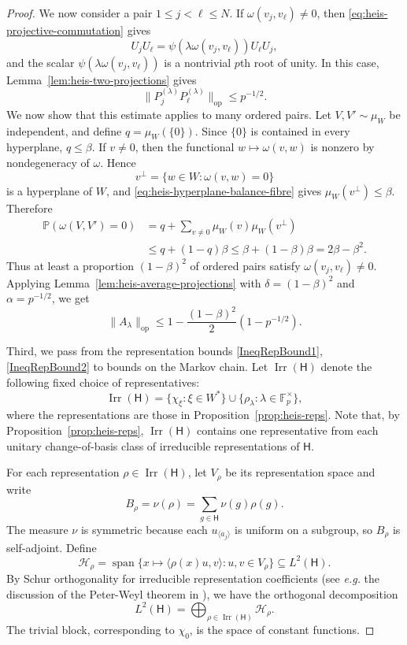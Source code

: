 \documentclass[11pt, reqno]{amsart}
\numberwithin{equation}{section}
\newcommand{\Fp}{\mathbb F_p}
\newcommand{\Heis}{\mathsf H}
\newcommand{\Prob}{\mathbb P}
\newcommand{\Irr}{\operatorname{Irr}}
\begin{document}
\begin{proof}
We now consider a pair $1 \leq j < \ell \leq N$. If \(\omega(v_j,v_\ell)\ne0\), then \eqref{eq:heis-projective-commutation}
gives
\[
    U_jU_\ell=\psi(\lambda\omega(v_j,v_\ell))U_\ell U_j,
\]
and the scalar \(\psi(\lambda\omega(v_j,v_\ell))\) is a nontrivial \(p\)th root
of unity. In this case, Lemma~\ref{lem:heis-two-projections} gives
\[
    \|P_j^{(\lambda)}P_\ell^{(\lambda)}\|_{\operatorname{op}}
    \le p^{-1/2}.
\]
We now show that this estimate applies to many ordered pairs.  Let
\(V,V' \sim \mu_W\) be independent, and define
\(q=\mu_W(\{0\})\).  Since \(\{0\}\) is contained in every hyperplane,
\(q\le\beta\). If \(v\ne0\), then the functional \(w\mapsto\omega(v,w)\) is nonzero by
nondegeneracy of \(\omega\).  Hence
\[
    v^\perp=\{w\in W:\omega(v,w)=0\}
\]
is a hyperplane of \(W\), and \eqref{eq:heis-hyperplane-balance-fibre}
gives \(\mu_W(v^\perp)\le\beta\).  Therefore
\[
\begin{aligned}
    \Prob(\omega(V,V')=0)
    &=q+\sum_{v\ne0}\mu_W(v)\mu_W(v^\perp)\\
    &\le q+(1-q)\beta
    \le \beta+(1-\beta)\beta
    =2\beta-\beta^2.
\end{aligned}
\]
Thus at least a proportion \((1-\beta)^2\) of ordered pairs satisfy
\(\omega(v_j,v_\ell)\ne0\).  Applying
Lemma~\ref{lem:heis-average-projections} with
\(\delta=(1-\beta)^2\) and \(\alpha=p^{-1/2}\), we get
\begin{equation} \label{IneqRepBound2}
    \|A_\lambda\|_{\operatorname{op}}
    \le1-\frac{(1-\beta)^2}{2}(1-p^{-1/2}).
\end{equation}

Third, we pass from the representation bounds \eqref{IneqRepBound1},
\eqref{IneqRepBound2} to bounds on the Markov chain.  Let
\(\Irr(\Heis)\) denote the following fixed choice of representatives:
\[
    \Irr(\Heis)
    =
    \{\chi_\xi:\xi\in W^*\}
    \cup
    \{\rho_\lambda:\lambda\in\Fp^\times\},
\]
where the representations are those in Proposition~\ref{prop:heis-reps}.
Note that, by Proposition~\ref{prop:heis-reps}, \(\Irr(\Heis)\) contains one representative from each unitary
change-of-basis class of irreducible representations of \(\Heis\).

For each representation \(\rho\in\Irr(\Heis)\), let \(V_\rho\) be its representation space and
write
\[
    B_\rho=\widehat\nu(\rho)=\sum_{g\in\Heis}\nu(g)\rho(g).
\]
The measure \(\nu\) is symmetric because each \(u_{\langle a_j\rangle}\) is
uniform on a subgroup, so \(B_\rho\) is self-adjoint.  Define
\[
    \mathcal H_\rho
    =
    \operatorname{span}\{x\mapsto \langle \rho(x)u,v\rangle:
      u,v\in V_\rho\}\subseteq L^2(\Heis).
\]
By Schur orthogonality
for irreducible representation coefficients (see \textit{e.g.} the discussion of the Peter-Weyl theorem in  \cite[Chapter~2]{Diaconis1988}), we have the orthogonal decomposition
\[
    L^2(\Heis)=\bigoplus_{\rho\in\Irr(\Heis)}\mathcal H_\rho.
\]
The
trivial block, corresponding to \(\chi_0\), is the space of constant
functions.


\end{proof}
\end{document}
